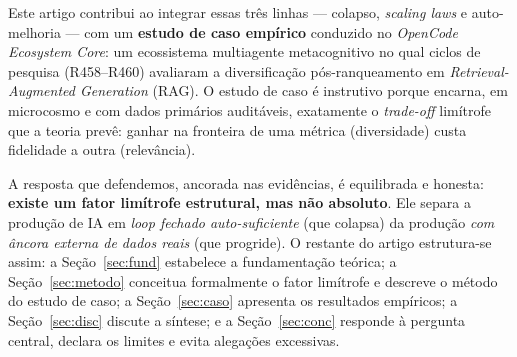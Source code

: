 Este artigo contribui ao integrar essas três linhas --- colapso, \emph{scaling
laws} e auto-melhoria --- com um \textbf{estudo de caso empírico} conduzido no
\emph{OpenCode Ecosystem Core}: um ecossistema multiagente metacognitivo no qual
ciclos de pesquisa (R458--R460) avaliaram a diversificação pós-ranqueamento em
\emph{Retrieval-Augmented Generation} (RAG). O estudo de caso é instrutivo porque
encarna, em microcosmo e com dados primários auditáveis, exatamente o \emph{trade-off
} limítrofe que a teoria prevê: ganhar na fronteira de uma métrica (diversidade)
custa fidelidade a outra (relevância).

A resposta que defendemos, ancorada nas evidências, é equilibrada e honesta:
\textbf{existe um fator limítrofe estrutural, mas não absoluto}. Ele separa a
produção de IA em \emph{loop fechado auto-suficiente} (que colapsa) da produção
\emph{com âncora externa de dados reais} (que progride). O restante do artigo
estrutura-se assim: a Seção~\ref{sec:fund} estabelece a fundamentação teórica; a
Seção~\ref{sec:metodo} conceitua formalmente o fator limítrofe e descreve o
método do estudo de caso; a Seção~\ref{sec:caso} apresenta os resultados
empíricos; a Seção~\ref{sec:disc} discute a síntese; e a Seção~\ref{sec:conc}
responde à pergunta central, declara os limites e evita alegações excessivas.
